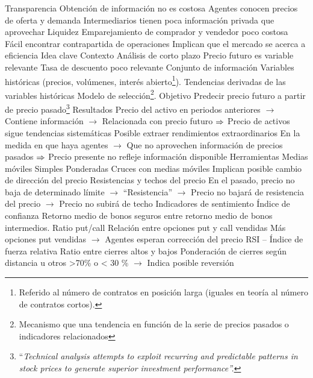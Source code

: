 \documentclass{nuevotema}
\begin{document}
\begin{esquemal}
			\3 Transparencia
				\4 Obtención de información no es costosa
				\4 Agentes conocen precios de oferta y demanda
				\4 Intermediarios tienen poca información privada que aprovechar
			\3 Liquidez
				\4 Emparejamiento de comprador y vendedor poco costosa
				\4 Fácil encontrar contrapartida de operaciones
				\4
			\3[$\then$] Implican que el mercado se acerca a eficiencia
	\1 
		\2 Idea clave
			\3 Contexto
				\4 Análisis de corto plazo
				\4 Precio futuro es variable relevante
				\4 Tasa de descuento poco relevante
			\3 Conjunto de información
				\4 Variables históricas (precios, volúmenes, interés abierto\footnote{Referido al número de contratos en posición larga (iguales en teoría al número de contratos cortos).}).
				\4 Tendencias derivadas de las variables históricas
				\4 Modelo de selección\footnote{Mecanismo que  una tendencia en función de la serie de precios pasados o indicadores relacionados}.
				\4 Objetivo
				\4 Predecir precio futuro a partir de precio pasado\footnote{``\textit{Technical analysis attempts to exploit recurring and predictable patterns in stock prices to
                generate superior investment performance''.}}
				\4 Resultados
				\4 Precio del activo en periodos anteriores
				\4[] $\to$ Contiene información
				\4[] $\to$ Relacionada con precio futuro
				\4[] $\then$ Precio de activos sigue tendencias sistemáticas
				\4 Posible extraer rendimientos extraordinarios
				\4[] En la medida en que haya agentes
				\4[] $\to$ Que no aprovechen información de precios pasados
				\4[] $\then$ Precio presente no refleje información disponible
		\2 Herramientas
			\3 Medias móviles
				\4 Simples
				\4 Ponderadas
				\4 Cruces con medias móviles
				\4[] Implican posible cambio de dirección del precio
			\3 Resistencias y techos
				\4  del precio
				\4[] En el pasado, precio no baja de determinado límite
				\4[] $\to$ ``Resistencia''
				\4[] $\to$ Precio no bajará de resistencia
				\4  del precio
				\4[] $\to$ Precio no subirá de techo
			\3 Indicadores de sentimiento
				\4 Índice de confianza
				\4[] Retorno medio de bonos seguros entre retorno medio de bonos intermedios.
				\4 Ratio put/call
				\4[] Relación entre opciones put y call vendidas
				\4[] Más opciones put vendidas
				\4[] $\to$ Agentes esperan corrección del precio
				\4 RSI -- Índice de fuerza relativa
				\4[] Ratio entre cierres altos y bajos
				\4[] Ponderación de cierres según distancia u otros
				\4[] >70\% o < 30 \%
				\4[] $\to$ Indica posible reversión

\end{esquemal}
\end{document}
